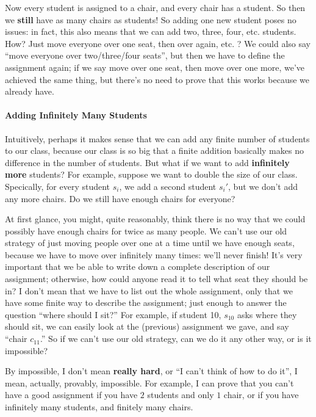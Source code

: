 \documentclass[10pt]{article}
\begin{document}
Now every student is assigned to a chair, and every chair has a student. 
So then we \textbf{still} have as many chairs as students!
So adding one new student poses no issues: in fact, this also means that we can add two, three, four, etc. students.
How?
Just move everyone over one seat, then over again, etc.
?
We could also say ``move everyone over two/three/four seats'', but then we have to define the assignment again; if we say move over one seat, then move over one more, we've achieved the same thing, but there's no need to prove that this works because we already have.

\paragraph{Adding Infinitely Many Students}
Intuitively, perhaps it makes sense that we can add any finite number of students to our class, because our class is so big that a finite addition basically makes no difference in the number of students.
But what if we want to add \textbf{infinitely more} students? For example, suppose we want to double the size of our class.
Specically, for every student $s_i$, we add a second student $s_{i}'$, but we don't add any more chairs.
Do we still have enough chairs for everyone?

At first glance, you might, quite reasonably, think there is no way that we could possibly have enough chairs for twice as many people.
We can't use our old strategy of just moving people over one at a time until we have enough seats, because we have to move over infinitely many times: we'll never finish!
It's very important that we be able to write down a complete description of our assignment; otherwise, how could anyone read it to tell what seat they should be in?
I don't mean that we have to list out the whole assignment, only that we have some finite way to describe the assignment; just enough to answer the question ``where should I sit?''
For example, if student 10, $s_{10}$ asks where they should sit, we can easily look at the (previous) assignment we gave, and say ``chair $c_{11}$.''
So if we can't use our old strategy, can we do it any other way, or is it impossible?

By impossible, I don't mean \textbf{really hard}, or ``I can't think of how to do it'', I mean, actually, provably, impossible.
For example, I can prove that you can't have a good assignment if you have $2$ students and only $1$ chair, or if you have infinitely many students, and finitely many chairs. 
\end{document}
